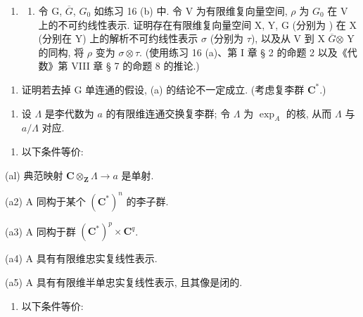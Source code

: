 \begin{enumerate}
\def\labelenumi{\arabic{enumi}.}
\setcounter{enumi}{16}
\tightlist
\item
  \begin{enumerate}
  \def\labelenumii{(\alph{enumii})}
  \tightlist
  \item
    令 G, \(\overline{G}\), \(G_{0}\) 如练习 16 (b) 中. 令 V 为有限维复向量空间, \(\rho\) 为 \(G_{0}\) 在 V 上的不可约线性表示. 证明存在有限维复向量空间 X, Y, G (分别为 ) 在 X (分别在 Y) 上的解析不可约线性表示 \(\sigma\) (分别为 \(\tau\)), 以及从 V 到 X \(\overline{G}\)\(\otimes\) Y 的同构, 将 \(\rho\) 变为 \(\sigma \otimes \tau\). (使用练习 16 (a)、第 I 章 § 2 的命题 2 以及《代数》第 VIII 章 § 7 的命题 8 的推论.)
  \end{enumerate}
\end{enumerate}

\begin{enumerate}
\def\labelenumi{(\alph{enumi})}
\setcounter{enumi}{1}
\tightlist
\item
  证明若去掉 G 单连通的假设, (a) 的结论不一定成立. (考虑复李群 \(\mathbf{C}^*\).)
\end{enumerate}

\begin{enumerate}
\def\labelenumi{\arabic{enumi}.}
\setcounter{enumi}{17}
\tightlist
\item
  设 \(\Lambda\) 是李代数为 \(a\) 的有限维连通交换复李群; 令 \(\Lambda\) 为 \(\exp_{A}\) 的核, 从而 \(\Lambda\) 与 \(a / \Lambda\) 对应.
\end{enumerate}

\begin{enumerate}
\def\labelenumi{(\alph{enumi})}
\tightlist
\item
  以下条件等价:
\end{enumerate}

(al) 典范映射 \(\mathbf{C} \otimes_{\mathbf{Z}} \Lambda \to a\) 是单射.

(a2) A 同构于某个 \((\mathbf{C}^{*})^{n}\) 的李子群.

(a3) A 同构于群 \((\mathbf{C}^{*})^{p}\times \mathbf{C}^{q}\).

(a4) A 具有有限维忠实复线性表示.

(a5) A 具有有限维半单忠实复线性表示, 且其像是闭的.

\begin{enumerate}
\def\labelenumi{(\alph{enumi})}
\setcounter{enumi}{1}
\tightlist
\item
  以下条件等价:
\end{enumerate}

